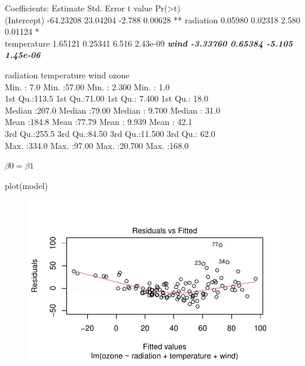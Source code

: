 \documentclass[
  a4paper,
  DIV=11,
  numbers=noendperiod]{scrartcl}
\newenvironment{Shaded}{\begin{snugshade}}{\end{snugshade}}
\newcommand{\FunctionTok}[1]{\textcolor[rgb]{0.28,0.35,0.67}{#1}}
\newcommand{\NormalTok}[1]{\textcolor[rgb]{0.00,0.23,0.31}{#1}}
\begin{document}
Coefficients: Estimate Std. Error t value
Pr(\textgreater\textbar t\textbar)\\
(Intercept) -64.23208 23.04204 -2.788 0.00628 ** radiation 0.05980
0.02318 2.580 0.01124 *\\
temperature 1.65121 0.25341 6.516 2.43e-09 \textbf{\emph{wind -3.33760
0.65384 -5.105 1.45e-06}}

radiation temperature wind ozone\\
Min. : 7.0 Min. :57.00 Min. : 2.300 Min. : 1.0\\
1st Qu.:113.5 1st Qu.:71.00 1st Qu.: 7.400 1st Qu.: 18.0\\
Median :207.0 Median :79.00 Median : 9.700 Median : 31.0\\
Mean :184.8 Mean :77.79 Mean : 9.939 Mean : 42.1\\
3rd Qu.:255.5 3rd Qu.:84.50 3rd Qu.:11.500 3rd Qu.: 62.0\\
Max. :334.0 Max. :97.00 Max. :20.700 Max. :168.0

\(\beta0 = \beta1\)

\begin{Shaded}
\begin{Highlighting}[]
\FunctionTok{plot}\NormalTok{(model)}
\end{Highlighting}
\end{Shaded}

\begin{figure}[H]

{\centering \includegraphics{StatsAssignment_files/figure-pdf/unnamed-chunk-8-1.pdf}

}

\end{figure}
\end{document}
